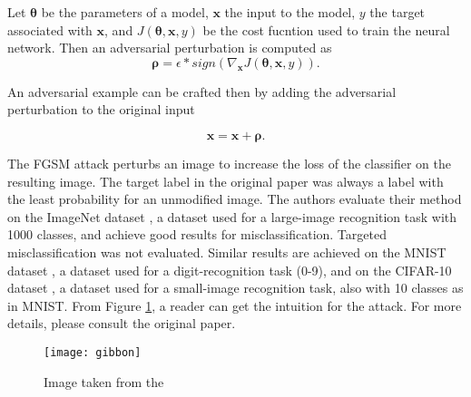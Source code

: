 Let $\pmb \theta$ be the parameters of a model, $\pmb x$ the input to the model, $y$ the target associated with $\pmb x$, and $J (\pmb \theta, \pmb x, y)$ be the cost fucntion used to train the neural network. Then an adversarial perturbation is computed as 
\[ 
\pmb \rho = \epsilon * sign (\nabla_{\pmb x} J(\pmb \theta, \pmb x, y)).
\]

An adversarial example can be crafted then by adding the adversarial perturbation to the original input

\[\pmb x = \pmb x + \pmb \rho .\]
 
 
The FGSM attack perturbs an image to increase the loss of the classifier on the resulting image. The target label in the original paper \cite{fgsm-original} was always a label with the least probability for an unmodified image. The authors evaluate their method on the ImageNet dataset \cite{datasetImageNet}, a dataset used for a large-image recognition task with 1000 classes, and achieve good results for misclassification. Targeted misclassification was not evaluated. Similar results are achieved on the MNIST dataset 	\cite{datasetMNIST}, a dataset used for a digit-recognition task (0-9), and on the CIFAR-10 dataset \cite{datasetCIFAR10}, a dataset used for a small-image recognition task, also with 10 classes as in MNIST. From Figure \ref{fig:gibbon}, a reader can get the intuition for the attack. For more details, please consult the original paper.

\begin{figure}[h]
\texttt{[image: gibbon]}
\caption{Image taken from the \cite{fgsm-original}}
\label{fig:gibbon}
\end{figure}


